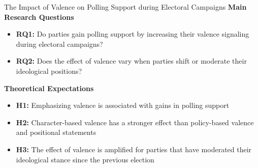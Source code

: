 \documentclass[9pt, aspectratio=169]{beamer}
\newcommand{\customcites}[1]{\textcolor{blue}{\footnotesize\parencites{#1}}}
\begin{document}
\begin{frame}{The Impact of Valence on Polling Support during Electoral Campaigns}
    \textbf{Main Research Questions}     \vspace{0.2cm}
    \begin{itemize}
        \item \textbf{RQ1:} Do parties gain polling support by increasing their valence signaling during electoral campaigns?\vspace{0.2cm}
        \item \textbf{RQ2:} Does the effect of valence vary when parties shift or moderate their ideological positions?\vspace{0.2cm}
    \end{itemize}
\vspace{0.3cm}
    \textbf{Theoretical Expectations} \vspace{0.2cm}
    \begin{itemize}
        \item \textbf{H1:} Emphasizing valence is associated with gains in polling support \customcites{adams2011anybody, abney2013valence}\vspace{0.2cm}
        \item \textbf{H2:} Character-based valence has a stronger effect than policy-based valence and positional statements \customcites{clark2009valence, Lenz2012}\vspace{0.2cm}
        \item \textbf{H3:} The effect of valence is amplified for parties that have moderated their ideological stance since the previous election
    \end{itemize}
\end{frame}
\end{document}
